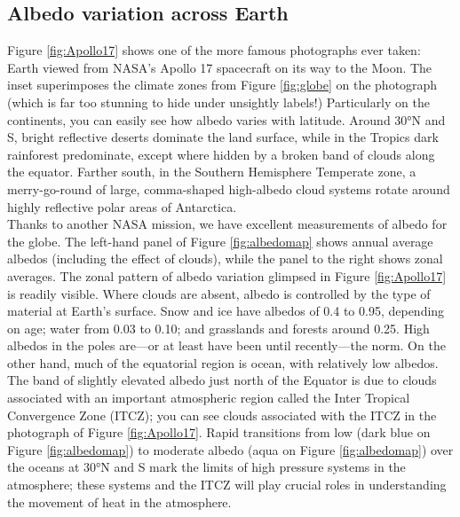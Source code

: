 \subsection{Albedo variation across Earth}
Figure \ref{fig:Apollo17} shows one of the more famous photographs ever taken: Earth viewed from NASA's Apollo 17 spacecraft on its way to the Moon. The inset superimposes the climate zones from Figure \ref{fig:globe} on the photograph (which is far too stunning to hide under unsightly labels!) Particularly on the continents, you can easily see how albedo varies with latitude. Around $\ang{30}$N and S, bright reflective deserts dominate the land surface, while in the Tropics dark rainforest predominate, except where hidden by a broken band of clouds along the equator. Farther south, in the Southern Hemisphere Temperate zone, a merry-go-round of large, comma-shaped high-albedo cloud systems rotate around highly reflective polar areas of Antarctica.\\
Thanks to another NASA mission, we have excellent measurements of albedo for the globe. The left-hand panel of Figure \ref{fig:albedomap} shows annual average albedos (including the effect of clouds), while the panel to the right shows zonal averages. The zonal pattern of albedo variation glimpsed in Figure \ref{fig:Apollo17} is readily visible. Where clouds are absent, albedo is controlled by the type of material at Earth's surface. Snow and ice have albedos of 0.4 to 0.95, depending on age; water from 0.03 to 0.10; and grasslands and forests around 0.25. High albedos in the poles are---or at least have been until recently---the norm. On the other hand, much of the equatorial region is ocean, with relatively low albedos. The band of slightly elevated albedo just north of the Equator is due to clouds associated with an important atmospheric region called the Inter Tropical Convergence Zone (ITCZ); you can see clouds associated with the ITCZ in the photograph of Figure \ref{fig:Apollo17}. Rapid transitions from low (dark blue on Figure \ref{fig:albedomap}) to moderate albedo (aqua on Figure \ref{fig:albedomap}) over the oceans at $\ang{30}$N and S mark the limits of high pressure systems in the atmosphere; these systems and the ITCZ will play crucial roles in understanding the movement of heat in the atmosphere.
